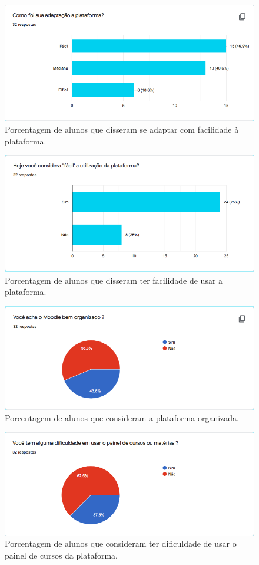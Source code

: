 \documentclass[11pt]{article}
\begin{document}
\setcounter{figure}{0}
\renewcommand{\figurename}{Gráfico}
\begin{figure}[htbp]
\centering
\includegraphics[width=.9\linewidth]{./media/grafico_adaptacao.png}
\caption{\label{fig:org8814b61}Porcentagem de alunos que disseram se adaptar com facilidade à plataforma.}
\end{figure}
\begin{figure}[htbp]
\centering
\includegraphics[width=.9\linewidth]{./media/grafico_uso.png}
\caption{\label{fig:org58661d7}Porcentagem de alunos que disseram ter facilidade de usar a plataforma.}
\end{figure}
\begin{figure}[htbp]
\centering
\includegraphics[width=.9\linewidth]{./media/grafico_organizacao.png}
\caption{\label{fig:org998f94a}Porcentagem de alunos que consideram a plataforma organizada.}
\end{figure}
\begin{figure}[htbp]
\centering
\includegraphics[width=.9\linewidth]{./media/grafico_painel.png}
\caption{\label{fig:orgab6de9a}Porcentagem de alunos que consideram ter dificuldade de usar o painel de cursos da plataforma.}
\end{figure}
\end{document}
